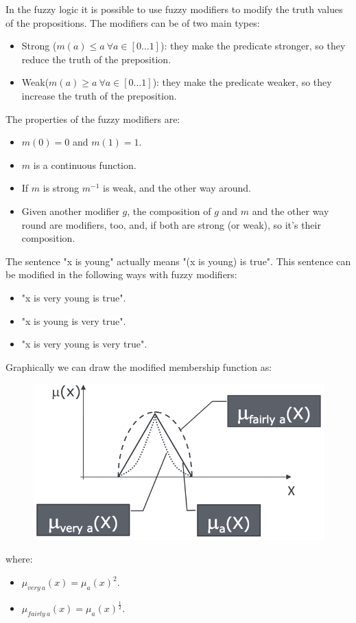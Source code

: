 \documentclass[12pt, a4paper]{report}
\newtheorem[style=M,bodystyle=\normalfont]{theorem}{Theorem}
\newtheorem[style=M,bodystyle=\normalfont]{corollary}{Corollary}
\newtheorem[style=M,bodystyle=\normalfont]{lemma}{Lemma}
\newtheorem[style=M,bodystyle=\normalfont]{definition}{Definition}
\begin{document}
    In the fuzzy logic it is possible to use fuzzy modifiers to modify the truth values of the propositions.     
    The modifiers can be of two main types: 
    \begin{itemize}
        \item Strong ($m(a) \leq a \: \forall a \in [0 \dots 1]$): they make the predicate stronger, so they reduce the truth of the preposition.
        \item Weak($m(a) \geq a \: \forall a \in [0 \dots 1]$): they make the predicate weaker, so they increase the truth of the preposition.
    \end{itemize}
    The properties of the fuzzy modifiers are:
    \begin{itemize}
        \item $m(0)=0$ and $m(1)=1$.
        \item $m$ is a continuous function. 
        \item If $m$ is strong $m^{-1}$ is weak, and the other way around.
        \item Given another modifier $g$, the composition of $g$ and $m$ and the other way round are modifiers, too, and, if both are strong
            (or weak), so it's their composition.
    \end{itemize}
    \begin{example}
        The sentence "x is young" actually means "(x is young) is true". This sentence can be modified in the following ways with fuzzy modifiers:
        \begin{itemize}
            \item "x is very young is true".
            \item "x is young is very true".
            \item "x is very young is very true". 
        \end{itemize}
        Graphically we can draw the modified membership function as: 
        \begin{figure}[H]
            \centering
            \includegraphics[width=0.4\linewidth]{images/modifiers.png}
        \end{figure}
        where: 
        \begin{itemize}
            \item $\mu_{very \: a}(x)=\mu_a(x)^2$.
            \item $\mu_{fairly \: a}(x)=\mu_a(x)^{\frac{1}{2}}$.
        \end{itemize}
    \end{example}
\end{document}
